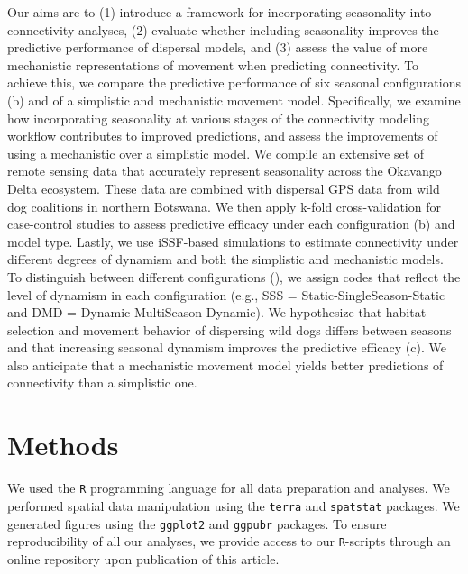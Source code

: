 \documentclass[abstract=on,10pt,a4paper,bibliography=totocnumbered]{article}
\newcommand{\inputy}[1]{\unskip}
\begin{document}
Our aims are to (1) introduce a framework for incorporating seasonality into
connectivity analyses, (2) evaluate whether including seasonality improves the
predictive performance of dispersal models, and (3) assess the value of more
mechanistic representations of movement when predicting connectivity. To achieve
this, we compare the predictive performance of six seasonal configurations
(b) and of a simplistic and mechanistic movement
model. Specifically, we examine how incorporating seasonality at various stages
of the connectivity modeling workflow contributes to improved predictions, and
assess the improvements of using a mechanistic over a simplistic model. We
compile an extensive set of remote sensing data that accurately represent
seasonality across the Okavango Delta ecosystem. These data are combined with
dispersal GPS data from \inputy{GeneralMetrics/CollarsTotal} wild dog coalitions
in northern Botswana. We then apply k-fold cross-validation for case-control
studies to assess predictive efficacy under each configuration
(b) and model type. Lastly, we use iSSF-based
simulations to estimate connectivity under different degrees of dynamism and
both the simplistic and mechanistic models. To distinguish between different
configurations (), we assign codes that reflect the
level of dynamism in each configuration (e.g., SSS = Static-SingleSeason-Static
and DMD = Dynamic-MultiSeason-Dynamic). We hypothesize that habitat selection
and movement behavior of dispersing wild dogs differs between seasons and that
increasing seasonal dynamism improves the predictive efficacy
(c). We also anticipate that a mechanistic movement
model yields better predictions of connectivity than a simplistic one.

\section{Methods}

We used the \texttt{R} programming language \citep{RCoreTeam.2023} for all data
preparation and analyses. We performed spatial data manipulation using the
\texttt{terra} \citep{Hijmans.2024} and \texttt{spatstat} \citep{Baddeley.2015}
packages. We generated figures using the \texttt{ggplot2} \citep{Wickham.2024}
and \texttt{ggpubr} \citep{Kassambara.2024} packages. To ensure reproducibility
of all our analyses, we provide access to our \texttt{R}-scripts through an
online repository upon publication of this article.
\end{document}

